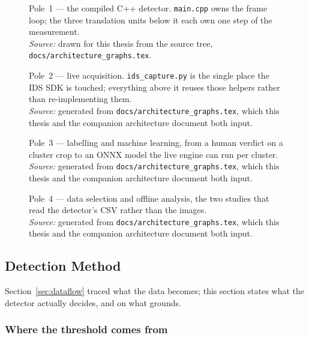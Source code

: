 \documentclass[a4paper,headsepline,oneside,11pt]{scrartcl}
\newcommand{\figsource}[1]{\\[3pt]{\footnotesize\emph{Source:} #1}}
\begin{document}
\begin{figure}[htbp]
  \centering
  \resizebox{0.82\textwidth}{!}{\qbArchDetector}
  \caption{Pole~1 --- the compiled C++ detector. \texttt{main.cpp} owns the frame
  loop; the three translation units below it each own one step of the
  measurement.\figsource{drawn for this thesis from the source tree,
  \texttt{docs/architecture\_graphs.tex}.}}
  \label{fig:arch-detector}
\end{figure}

\begin{figure}[htbp]
  \centering
  \resizebox{\textwidth}{!}{\qbArchLive}
  \caption{Pole~2 --- live acquisition. \texttt{ids\_capture.py} is the single
  place the IDS SDK is touched; everything above it reuses those helpers rather
  than re-implementing them.\figsource{generated from \texttt{docs/architecture\_graphs.tex}, which this thesis and the companion architecture document both input.}}
  \label{fig:arch-live}
\end{figure}

\begin{figure}[htbp]
  \centering
  \resizebox{\textwidth}{!}{\qbArchML}
  \caption{Pole~3 --- labelling and machine learning, from a human verdict on a
  cluster crop to an ONNX model the live engine can run per cluster.\figsource{generated from \texttt{docs/architecture\_graphs.tex}, which this thesis and the companion architecture document both input.}}
  \label{fig:arch-ml}
\end{figure}

\begin{figure}[htbp]
  \centering
  \resizebox{\textwidth}{!}{\qbArchAnalysis}
  \caption{Pole~4 --- data selection and offline analysis, the two studies that
  read the detector's CSV rather than the images.\figsource{generated from \texttt{docs/architecture\_graphs.tex}, which this thesis and the companion architecture document both input.}}
  \label{fig:arch-analysis}
\end{figure}

\subsection{Detection Method}
\label{sec:detection_method}

Section~\ref{sec:dataflow} traced what the data becomes; this section states
what the detector actually decides, and on what grounds.

\subsubsection{Where the threshold comes from}
\end{document}
